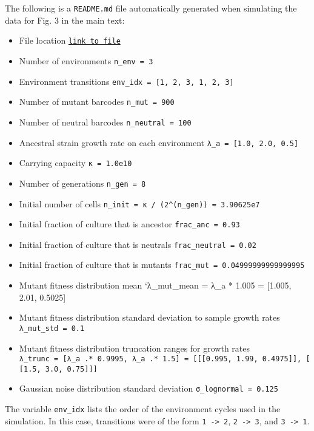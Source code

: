 \documentclass[
]{scrartcl}
\providecommand{\tightlist}{%
  \setlength{\itemsep}{0pt}\setlength{\parskip}{0pt}}\usepackage{longtable,booktabs,array}
\begin{document}
\begin{refsegment}
The following is a \texttt{README.md} file automatically generated when
simulating the data for Fig. 3 in the main text:

\begin{itemize}
\tightlist
\item
  File location
  \href{https://github.com/mrazomej/bayesian_fitness/blob/master/code/processing/data003_logistic_1000bc_03env_01rep/sim_multienv_data003.jl}{\texttt{link\ to\ file}}
\item
  Number of environments \texttt{n\_env\ =\ 3}
\item
  Environment transitions
  \texttt{env\_idx\ =\ {[}1,\ 2,\ 3,\ 1,\ 2,\ 3{]}}
\item
  Number of mutant barcodes \texttt{n\_mut\ =\ 900}
\item
  Number of neutral barcodes \texttt{n\_neutral\ =\ 100}
\item
  Ancestral strain growth rate on each environment
  \texttt{λ\_a\ =\ {[}1.0,\ 2.0,\ 0.5{]}}
\item
  Carrying capacity \texttt{κ\ =\ 1.0e10}
\item
  Number of generations \texttt{n\_gen\ =\ 8}
\item
  Initial number of cells
  \texttt{n\_init\ =\ κ\ /\ (2\^{}(n\_gen))\ =\ 3.90625e7}
\item
  Initial fraction of culture that is ancestor
  \texttt{frac\_anc\ =\ 0.93}
\item
  Initial fraction of culture that is neutrals
  \texttt{frac\_neutral\ =\ 0.02}
\item
  Initial fraction of culture that is mutants
  \texttt{frac\_mut\ =\ 0.04999999999999995}
\item
  Mutant fitness distribution mean `λ\_mut\_mean = λ\_a * 1.005 =
  {[}1.005, 2.01, 0.5025{]}
\item
  Mutant fitness distribution standard deviation to sample growth rates
  \texttt{λ\_mut\_std\ =\ 0.1}
\item
  Mutant fitness distribution truncation ranges for growth rates
  \texttt{λ\_trunc\ =\ {[}λ\_a\ .*\ 0.9995,\ λ\_a\ .*\ 1.5{]}\ =\ {[}{[}{[}0.995,\ 1.99,\ 0.4975{]}{]},\ {[}{[}1.5,\ 3.0,\ 0.75{]}{]}{]}}
\item
  Gaussian noise distribution standard deviation
  \texttt{σ\_lognormal\ =\ 0.125}
\end{itemize}

The variable \texttt{env\_idx} lists the order of the environment cycles
used in the simulation. In this case, transitions were of the form
\texttt{1\ -\textgreater{}\ 2}, \texttt{2\ -\textgreater{}\ 3}, and
\texttt{3\ -\textgreater{}\ 1}.


\end{refsegment}
\end{document}
